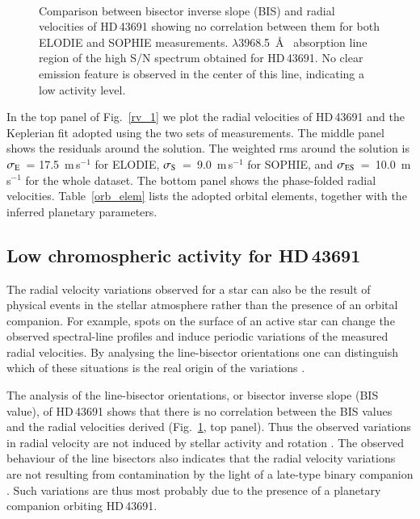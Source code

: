 \documentclass{aa}
\begin{document}
\begin{figure}[t!]
\centering
  \begin{minipage}[t]{0.45\textwidth}
    \centering
  \end{minipage} \\
  \begin{minipage}[t]{0.45\textwidth}
    \centering
  \end{minipage}\caption{\top Comparison between bisector inverse slope (BIS) and radial
           velocities of HD\,43691 showing no correlation between them
	   for both ELODIE and SOPHIE measurements.
	   \bot $\lambda$3968.5~\AA~ absorption line region
	   of the high S/N spectrum obtained for HD\,43691. No clear
	   emission feature is observed in the center of this line,
	   indicating a low activity level.}
  \label{bis_ca}
\end{figure}


In the top panel of Fig.~\ref{rv_1} we plot the radial velocities of
HD\,43691 and the Keplerian fit adopted using the two sets of measurements.
The middle panel shows the residuals around the solution. The weighted rms
around the solution is $\sigma_{\rm E}$~= 17.5~m\,s$^{-1}$ for ELODIE, 
$\sigma_{\rm S}$~=~9.0~m\,s$^{-1}$ for SOPHIE, and
$\sigma_{\rm ES}$~=~10.0~m\,s$^{-1}$ for the whole dataset. The bottom panel
shows the phase-folded radial velocities. Table~\ref{orb_elem} lists the
adopted orbital elements, together with the inferred planetary parameters.

\subsection{Low chromospheric activity for HD\,43691}
The radial velocity variations observed for a star can also be the result of
physical events in the stellar atmosphere rather than the presence of an
orbital companion. For example, spots on the surface of an active star can
change the observed spectral-line profiles and induce periodic variations
of the measured radial velocities. By analysing the line-bisector
orientations one can distinguish which of these situations is the real
origin of the variations \citep{Quelozetal2001}.

The analysis of the line-bisector orientations, or bisector inverse slope
(BIS value), of HD\,43691 shows that there is no correlation between the BIS
values and the radial velocities derived (Fig.~\ref{bis_ca}, top panel).
Thus the observed variations in radial velocity are not induced by stellar
activity and rotation
\citep[as is the case of HD\,166435 in][]{Quelozetal2001}.
The observed behaviour of the line bisectors also indicates that the
radial velocity variations are not resulting from contamination by the light
of a late-type binary companion
\citep[see e.g. the case of HD\,41004 in][]{Santosetal2002}. Such variations
are thus most probably due to the presence of a planetary companion
orbiting HD\,43691.
\end{document}
